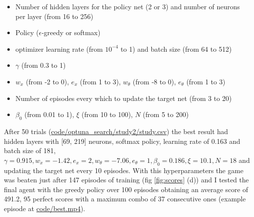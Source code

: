 \documentclass[a4paper, 11pt]{article}
\begin{document}
  \begin{itemize}
    \item Number of hidden layers for the policy net (2 or 3) and number of neurons per layer (from 16 to 256)
    \item Policy ($\epsilon$-greedy or softmax)
    \item optimizer learning rate (from $10^{-4}$ to 1) and batch size (from 64 to 512)
    \item $\gamma$ (from 0.3 to 1)
    \item $w_x$ (from -2 to 0), $e_x$ (from 1 to 3), $w_\theta$ (from -8 to 0), $e_\theta$ (from 1 to 3)
    \item Number of episodes every which to update the target net (from 3 to 20)
    \item $\beta_0$ (from 0.01 to 1), $\xi$ (from 10 to 100), $N$ (from 5 to 200)
  \end{itemize}

  After 50 trials (\url{code/optuna_search/study2/study.csv}) the best result had hidden layers with [69, 219] neurons, softmax policy, learning rate of 0.163 and batch size of 181, $\gamma = 0.915, w_x=-1.42, e_x=2, w_\theta=-7.06, e_\theta=1, \beta_0=0.186, \xi=10.1, N=18$ and updating the target net every 10 episodes. With this hyperparameters the game was beaten just after 147 episodes of training (fig \ref{fig:scores} (d)) and I tested the final agent with the greedy policy over 100 episodes obtaining an average score of 491.2, 95 perfect scores with a maximum combo of 37 consecutive ones (example episode at \url{code/best.mp4}).
\end{document}
